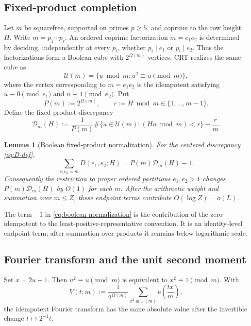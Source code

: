 \documentclass[11pt]{article}
\newtheorem{lemma}[lemma]{Lemma}
\theoremstyle{definition}
\theoremstyle{remark}
\newcommand{\Dcal}{\mathcal D}
\newcommand{\e}{\mathrm e}
\newcommand{\1}{\mathbf 1}
\newcommand{\Om}{\Omega}
\begin{document}
\subsection{Fixed-product completion}
Let $m$ be squarefree, supported on primes $p\ge5$, and coprime to the row height $H$.  Write $m=p_1\cdots p_r$.  An ordered coprime factorization $m=e_1e_2$ is determined by deciding, independently at every $p_i$, whether $p_i\mid e_1$ or $p_i\mid e_2$.  Thus the factorizations form a Boolean cube with $2^{\Om(m)}$ vertices.  CRT realizes the same cube as
\[
\mathcal U(m)=\{u\bmod m:u^2\equiv u\pmod m\},
\]
where the vertex corresponding to $m=e_1e_2$ is the idempotent satisfying $u\equiv0\pmod{e_1}$ and $u\equiv1\pmod{e_2}$.  Put
\[
P(m):=2^{\Om(m)},\qquad r:=H\bmod m\in\{1,\ldots,m-1\}.
\]
Define the fixed-product discrepancy
\begin{equation}\label{eq:boolean-discrepancy}
\Dcal_m(H)
 :=\frac1{P(m)}\#\{u\in\mathcal U(m):(Hu\bmod m)<r\}-\frac rm.
\end{equation}

\begin{lemma}[Boolean fixed-product normalization]\label{lem:boolean-normalization}
For the centered discrepancy \cref{eq:D-def},
\begin{equation}\label{eq:boolean-normalization}
\boxed{\sum_{e_1e_2=m}D(e_1,e_2;H)
      =P(m)\Dcal_m(H)-1.}
\end{equation}
Consequently the restriction to proper ordered partitions $e_1,e_2>1$ changes $P(m)\Dcal_m(H)$ by $O(1)$ for each $m$.  After the arithmetic weight and summation over $m\le Z$, these endpoint terms contribute $O(\log Z)=o(L)$.
\end{lemma}

The term $-1$ in \cref{eq:boolean-normalization} is the contribution of the zero idempotent to the least-positive-representative convention.  It is an identity-level endpoint term; after summation over products it remains below logarithmic scale.

\subsection{Fourier transform and the unit second moment}
Set $x=2u-1$.  Then $u^2\equiv u\pmod m$ is equivalent to $x^2\equiv1\pmod m$.  With
\begin{equation}\label{eq:V-def}
V(t;m):=\frac1{2^{\Om(m)}}\sum_{x^2\equiv1\ (m)}\e\!\left(\frac{tx}{m}\right),
\end{equation}
the idempotent Fourier transform has the same absolute value after the invertible change $t\mapsto 2^{-1}t$.
\end{document}
